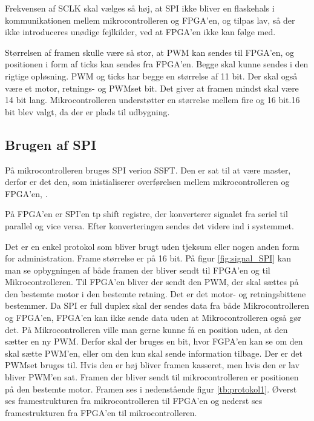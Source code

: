 Frekvensen af SCLK skal vælges så høj, at SPI ikke bliver en flaskehals i kommunikationen mellem mikrocontrolleren og FPGA’en, og tilpas lav, så der ikke introduceres unødige fejlkilder, ved at FPGA’en ikke kan følge med. 

Størrelsen af framen skulle være så stor, at PWM kan sendes til FPGA’en, og positionen i form af ticks kan sendes fra FPGA’en. Begge skal kunne sendes i den rigtige opløsning. PWM og ticks har begge en størrelse af 11 bit. Der skal også være et motor, retnings- og PWMset bit. Det giver at framen mindst skal være 14 bit lang. Mikrocontrolleren understøtter en størrelse mellem fire og 16 bit.16 bit blev valgt, da der er plads til udbygning.


\subsection{Brugen af SPI}


På mikrocontrolleren bruges SPI verion SSFT. Den er sat til at være master, derfor er det den, som inistialiserer overførelsen mellem mikrocontrolleren og FPGA'en, \citep[Kap. 13]{lm3s6965}.

På FPGA'en er SPI'en tp shift registre, der konverterer signalet fra seriel til parallel og vice versa. Efter konverteringen sendes det videre ind i systemmet. 

%

Det er en enkel protokol som bliver brugt uden tjeksum eller nogen anden form for administration. Frame størrelse er på 16 bit. På figur \ref{fig:signal_SPI} kan man se opbygningen af både framen der bliver sendt til FPGA’en og til Mikrocontrolleren. Til FPGA’en bliver der sendt den PWM, der skal sættes på den bestemte motor i den bestemte retning. Det er det motor- og retningsbittene bestemmer. Da SPI er full duplex skal der sendes data fra både Mikrocontrolleren og FPGA’en, FPGA’en kan ikke sende data uden at Mikrocontrolleren også gør det. På Mikrocontrolleren ville man gerne kunne få en position uden, at den sætter en ny PWM. Derfor skal der bruges en bit, hvor FGPA’en kan se om den skal sætte PWM’en, eller om den kun skal sende information tilbage. Der er det PWMset bruges til. Hvis den er høj bliver framen kasseret, men hvis den er lav bliver PWM’en sat. Framen der bliver sendt til mikrocontrolleren er positionen på den bestemte motor. Framen ses i nedenstående figur \ref{tb:protokol1}. Øverst ses framestrukturen fra mikrocontrolleren til FPGA'en og nederst ses framestrukturen fra FPGA'en til mikrocontrolleren. 

